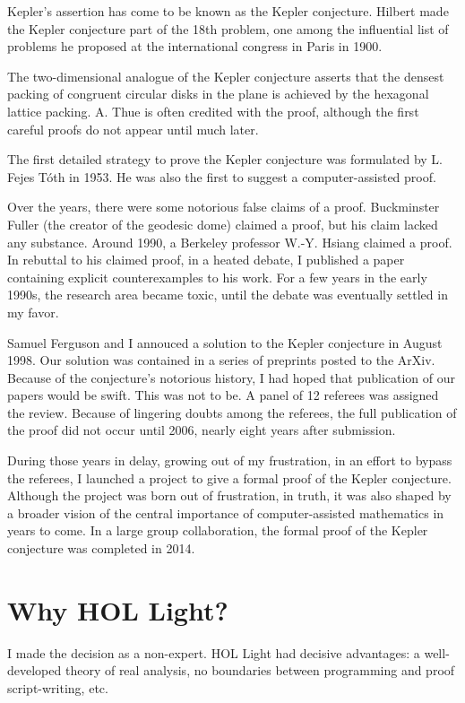 \documentclass{amsart}
\begin{document}
Kepler's assertion has come to be known as the Kepler conjecture.
Hilbert made the Kepler conjecture part of the 18th problem, one among
the influential list of problems he proposed at the international
congress in Paris in 1900.

The two-dimensional analogue of the Kepler conjecture asserts that the
densest packing of congruent circular disks in the plane is achieved
by the hexagonal lattice packing.  A. Thue is often credited with the
proof, although the first careful proofs do not appear until much
later.

The first detailed strategy to prove the Kepler conjecture was
formulated by L. Fejes T\'oth in 1953.  He was also the first to
suggest a computer-assisted proof.

Over the years, there were some notorious false claims of a proof.
Buckminster Fuller (the creator of the geodesic dome) claimed a proof,
but his claim lacked any substance.  Around 1990, a Berkeley professor
W.-Y. Hsiang claimed a proof.  In rebuttal to his claimed proof, in a
heated debate, I published a paper containing explicit counterexamples
to his work.  For a few years in the early 1990s, the research area
became toxic, until the debate was eventually settled in my favor.

Samuel Ferguson and I annouced a solution to the Kepler conjecture in
August 1998.  Our solution was contained in a series of preprints
posted to the ArXiv.  Because of the conjecture's notorious history, I
had hoped that publication of our papers would be swift. This was not
to be.  A panel of 12 referees was assigned the review.  Because of
lingering doubts among the referees, the full publication of the proof
did not occur until 2006, nearly eight years after submission.

During those years in delay, growing out of my frustration, in an
effort to bypass the referees, I launched a project to give a formal
proof of the Kepler conjecture.  Although the project was born out of
frustration, in truth, it was also
shaped by a broader vision of the central importance of
computer-assisted mathematics in years to come.  In a large group
collaboration, the formal proof of the Kepler conjecture was completed
in 2014.

\section{Why HOL Light?}

I made the decision as a non-expert.  HOL Light had decisive
advantages: a well-developed theory of real analysis, no boundaries
between programming and proof script-writing, etc.
\end{document}
